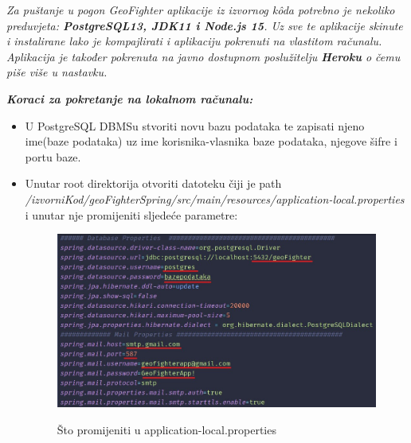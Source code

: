			\textit{Za puštanje u pogon GeoFighter aplikacije iz izvornog kôda potrebno je nekoliko preduvjeta: \textbf{PostgreSQL13, JDK11 i Node.js 15}. Uz sve te aplikacije skinute i instalirane lako je kompajlirati i aplikaciju pokrenuti na vlastitom računalu. Aplikacija je također pokrenuta na javno dostupnom poslužitelju \textbf{Heroku} o čemu piše više u nastavku.\\}
			
			\textbf{\textit{Koraci za pokretanje na lokalnom računalu:}}
			
			\begin{itemize}
				
				\item U PostgreSQL DBMSu stvoriti novu bazu podataka te zapisati njeno ime(baze podataka) uz ime korisnika-vlasnika baze podataka, njegove šifre i portu baze.
				
				\item Unutar root direktorija otvoriti datoteku čiji je path\\ \textit{/izvorniKod/geoFighterSpring/src/main/resources/application-local.properties}\\ i unutar nje promijeniti sljedeće parametre: 
			
				\begin{figure}[H]
					\centering
					\includegraphics[scale=0.4]{slike/Properties} \\%
					\caption{Što promijeniti u application-local.properties}
					\label{fig:properties} %
				\end{figure}
			

\end{itemize}
